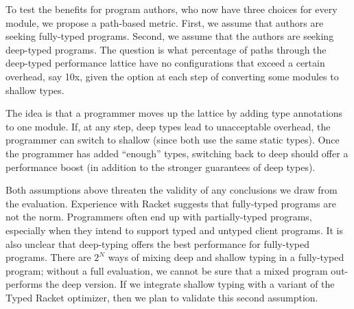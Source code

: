 To test the benefits for program authors, who now have three choices for every
module, we propose a path-based metric.
First, we assume that authors are seeking fully-typed programs.
Second, we assume that the authors are seeking deep-typed programs.
The question is what percentage of paths through the deep-typed performance
lattice have no configurations that exceed a certain overhead, say 10x, given
the option at each step of converting some modules to shallow types.

The idea is that a programmer moves up the lattice by adding type annotations
to one module.
If, at any step, deep types lead to unacceptable overhead, the programmer can
switch to shallow (since both use the same static types).
Once the programmer has added ``enough'' types, switching back to deep should
offer a performance boost (in addition to the stronger guarantees of deep types).

Both assumptions above threaten the validity of any conclusions we draw from the
evaluation.
Experience with Racket suggests that fully-typed programs are not the norm.
Programmers often end up with partially-typed programs, especially when they
intend to support typed and untyped client programs.
It is also unclear that deep-typing offers the best performance for fully-typed
programs.
There are $2^N$ ways of mixing deep and shallow typing in a fully-typed program;
 without a full evaluation, we cannot be sure that a mixed program out-performs
 the deep version.
If we integrate shallow typing with a variant of the Typed Racket optimizer,
then we plan to validate this second assumption.
